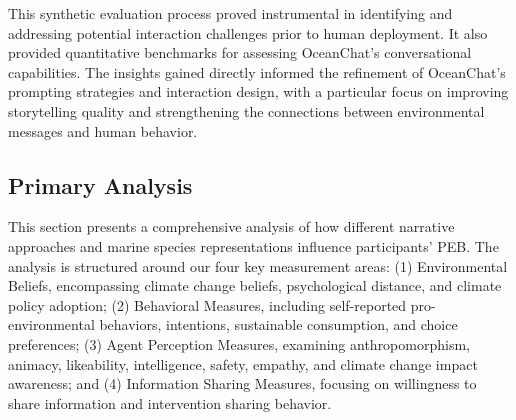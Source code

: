 \documentclass[sigconf, nonacm]{acmart}
\begin{document}
\begin{table}[ht]
    \centering
    \caption{Summary feedback comparing two system prompts from 300 LLM review agents.}
    \label{tab:summaries}
\end{table}

This synthetic evaluation process proved instrumental in identifying and addressing potential interaction challenges prior to human deployment. It also provided quantitative benchmarks for assessing OceanChat’s conversational capabilities. The insights gained directly informed the refinement of OceanChat’s prompting strategies and interaction design, with a particular focus on improving storytelling quality and strengthening the connections between environmental messages and human behavior.

\subsection{Primary Analysis}
This section presents a comprehensive analysis of how different narrative approaches and marine species representations influence participants' PEB. The analysis is structured around our four key measurement areas: (1) Environmental Beliefs, encompassing climate change beliefs, psychological distance, and climate policy adoption; (2) Behavioral Measures, including self-reported pro-environmental behaviors, intentions, sustainable consumption, and choice preferences; (3) Agent Perception Measures, examining anthropomorphism, animacy, likeability, intelligence, safety, empathy, and climate change impact awareness; and (4) Information Sharing Measures, focusing on willingness to share information and intervention sharing behavior.
\end{document}
